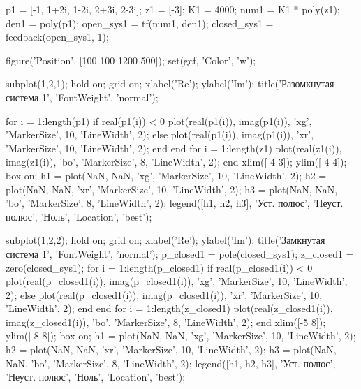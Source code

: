 p1 = [-1, 1+2i, 1-2i, 2+3i, 2-3i];
z1 = [-3];
K1 = 4000;
num1 = K1 * poly(z1);
den1 = poly(p1);
open_sys1 = tf(num1, den1);
closed_sys1 = feedback(open_sys1, 1);

figure('Position', [100 100 1200 500]);
set(gcf, 'Color', 'w');

subplot(1,2,1);
hold on;
grid on;
xlabel('Re');
ylabel('Im');
title('Разомкнутая система 1', 'FontWeight', 'normal');

for i = 1:length(p1)
    if real(p1(i)) < 0
        plot(real(p1(i)), imag(p1(i)), 'xg', 'MarkerSize', 10, 'LineWidth', 2);
    else
        plot(real(p1(i)), imag(p1(i)), 'xr', 'MarkerSize', 10, 'LineWidth', 2);
    end
end
for i = 1:length(z1)
    plot(real(z1(i)), imag(z1(i)), 'bo', 'MarkerSize', 8, 'LineWidth', 2);
end
xlim([-4 3]);
ylim([-4 4]);
box on;
h1 = plot(NaN, NaN, 'xg', 'MarkerSize', 10, 'LineWidth', 2);
h2 = plot(NaN, NaN, 'xr', 'MarkerSize', 10, 'LineWidth', 2);
h3 = plot(NaN, NaN, 'bo', 'MarkerSize', 8, 'LineWidth', 2);
legend([h1, h2, h3], {'Уст. полюс', 'Неуст. полюс', 'Ноль'}, 'Location', 'best');

subplot(1,2,2);
hold on;
grid on;
xlabel('Re');
ylabel('Im');
title('Замкнутая система 1', 'FontWeight', 'normal');
p_closed1 = pole(closed_sys1);
z_closed1 = zero(closed_sys1);
for i = 1:length(p_closed1)
    if real(p_closed1(i)) < 0
        plot(real(p_closed1(i)), imag(p_closed1(i)), 'xg', 'MarkerSize', 10, 'LineWidth', 2);
    else
        plot(real(p_closed1(i)), imag(p_closed1(i)), 'xr', 'MarkerSize', 10, 'LineWidth', 2);
    end
end
for i = 1:length(z_closed1)
    plot(real(z_closed1(i)), imag(z_closed1(i)), 'bo', 'MarkerSize', 8, 'LineWidth', 2);
end
xlim([-5 8]);
ylim([-8 8]);
box on;
h1 = plot(NaN, NaN, 'xg', 'MarkerSize', 10, 'LineWidth', 2);
h2 = plot(NaN, NaN, 'xr', 'MarkerSize', 10, 'LineWidth', 2);
h3 = plot(NaN, NaN, 'bo', 'MarkerSize', 8, 'LineWidth', 2);
legend([h1, h2, h3], {'Уст. полюс', 'Неуст. полюс', 'Ноль'}, 'Location', 'best');

